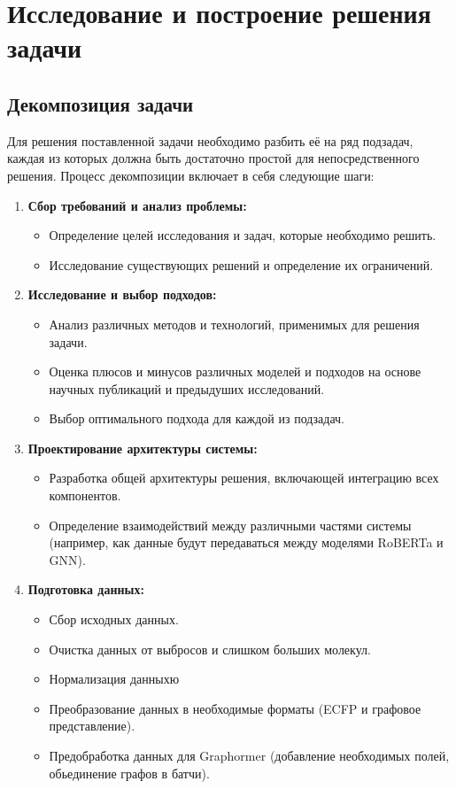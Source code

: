 \section{Исследование и построение решения задачи}
\label{sec:Chapter3} 




\subsection{Декомпозиция задачи}
Для решения поставленной задачи необходимо разбить её на ряд подзадач, каждая из которых должна быть достаточно простой для непосредственного решения. Процесс декомпозиции включает в себя следующие шаги:

\begin{enumerate}
\item \textbf{Сбор требований и анализ проблемы:}
\begin{itemize}
    \item Определение целей исследования и задач, которые необходимо решить.
    \item Исследование существующих решений и определение их ограничений.
\end{itemize}

\item \textbf{Исследование и выбор подходов:}
\begin{itemize}
    \item Анализ различных методов и технологий, применимых для решения задачи.
    \item Оценка плюсов и минусов различных моделей и подходов на основе научных публикаций и предыдуших исследований.
    \item Выбор оптимального подхода для каждой из подзадач.
\end{itemize}

\item \textbf{Проектирование архитектуры системы:}
\begin{itemize}
    \item Разработка общей архитектуры решения, включающей интеграцию всех компонентов.
    \item Определение взаимодействий между различными частями системы (например, как данные будут передаваться между моделями RoBERTa и GNN).
\end{itemize}

\item \textbf{Подготовка данных:}
\begin{itemize}
    \item Сбор исходных данных.
    \item Очистка данных от выбросов и слишком больших молекул.
    \item Нормализация данныхю
    \item Преобразование данных в необходимые форматы (ECFP и графовое представление).
    \item Предобработка данных для Graphormer (добавление необходимых полей, обьединение графов в батчи).
\end{itemize}


\end{enumerate}
